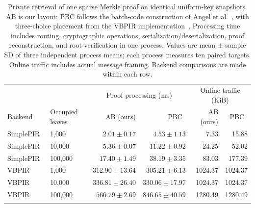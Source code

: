 \begin{table}[t]
\centering\small
\caption{Private retrieval of one sparse Merkle proof on identical uniform-key snapshots. AB is our layout; PBC follows the batch-code construction of Angel et al.~\cite{sealpir}, with three-choice placement from the VBPIR implementation~\cite{vectorbatchpir}. Processing time includes routing, cryptographic operations, serialization/deserialization, proof reconstruction, and root verification in one process. Values are mean $\pm$ sample SD of three independent process means; each process measures ten paired targets. Online traffic includes actual message framing. Backend comparisons are made within each row.}
\label{tab:external-core}
\setlength{\tabcolsep}{8pt}
\begin{tabular}{llrrrr}\toprule
 & & \multicolumn{2}{c}{Proof processing (ms)} & \multicolumn{2}{c}{Online traffic (KiB)}\\
Backend & Occupied leaves & AB (ours) & PBC~\cite{sealpir} & AB (ours) & PBC~\cite{sealpir}\\\midrule
SimplePIR~\cite{simplepir} & 1,000 & $2.01\pm 0.17$ & $4.53\pm 1.13$ & 7.33 & 15.88 \\
SimplePIR~\cite{simplepir} & 10,000 & $5.36\pm 0.07$ & $11.22\pm 0.92$ & 24.25 & 52.02 \\
SimplePIR~\cite{simplepir} & 100,000 & $17.40\pm 1.49$ & $38.19\pm 3.35$ & 83.03 & 177.39 \\
\addlinespace
VBPIR~\cite{vectorbatchpir} & 1,000 & $312.90\pm 13.64$ & $305.21\pm 6.13$ & 1024.37 & 1024.37 \\
VBPIR~\cite{vectorbatchpir} & 10,000 & $336.81\pm 26.40$ & $330.06\pm 17.97$ & 1024.37 & 1024.37 \\
VBPIR~\cite{vectorbatchpir} & 100,000 & $566.79\pm 2.69$ & $846.65\pm 40.59$ & 1280.49 & 1280.49 \\
\addlinespace
\bottomrule\end{tabular}
\end{table}
